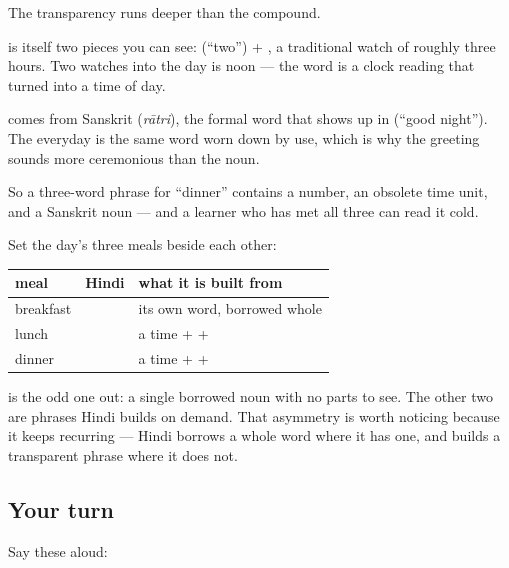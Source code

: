 \begin{cousinweb}
The transparency runs deeper than the compound.

\textbf{} is itself two pieces you can see: \textbf{} (\textquotedblleft{}two\textquotedblright{}) + \textbf{}, a traditional watch of roughly three hours. Two watches into the day is noon — the word is a clock reading that turned into a time of day.

\textbf{} comes from Sanskrit \textbf{} (\emph{rātri}), the formal word that shows up in \textbf{ } (\textquotedblleft{}good night\textquotedblright{}). The everyday \textbf{} is the same word worn down by use, which is why the greeting sounds more ceremonious than the noun.

So a three-word phrase for \textquotedblleft{}dinner\textquotedblright{} contains a number, an obsolete time unit, and a Sanskrit noun — and a learner who has met all three can read it cold.
\end{cousinweb}

\begin{grammarlens}[title={Grammar Lens: the pattern, not the pair}]
Set the day's three meals beside each other:

\noindent
\begin{tabularx}{\linewidth}{@{}>{\raggedright\arraybackslash}X>{\raggedright\arraybackslash}X>{\raggedright\arraybackslash}X@{}}
\toprule
\textbf{meal} & \textbf{Hindi} & \textbf{what it is built from} \\
\midrule
breakfast & \hi{नाश्ता} & its own word, borrowed whole \\
lunch & \hi{दोपहर} \hi{का} \hi{खाना} & a time + \hi{का} + \hi{खाना} \\
dinner & \hi{रात} \hi{का} \hi{खाना} & a time + \hi{का} + \hi{खाना} \\
\bottomrule
\end{tabularx}

\textbf{} is the odd one out: a single borrowed noun with no parts to see. The other two are phrases Hindi builds on demand. That asymmetry is worth noticing because it keeps recurring — Hindi borrows a whole word where it has one, and builds a transparent phrase where it does not.
\end{grammarlens}

\subsection*{Your turn}
Say these aloud:


